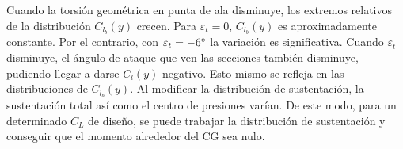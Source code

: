 \noindent
Cuando la torsión geométrica en punta de ala disminuye, los extremos relativos de la distribución $C_{l_b}(y)$ crecen. Para $\varepsilon_t = 0$, $C_{l_b}(y)$ es aproximadamente constante. Por el contrario, con $\varepsilon_t = -6\mathrm{^{\circ}}$ la variación es significativa. Cuando $\varepsilon_t$ disminuye, el ángulo de ataque que ven las secciones también disminuye, pudiendo llegar a darse $C_l(y)$ negativo. Esto mismo se refleja en las distribuciones de $C_{l_b}(y)$. Al modificar la distribución de sustentación, la sustentación total así como el centro de presiones varían. De este modo, para un determinado $C_L$ de diseño, se puede trabajar la distribución de sustentación y conseguir que el momento alrededor del CG sea nulo.





